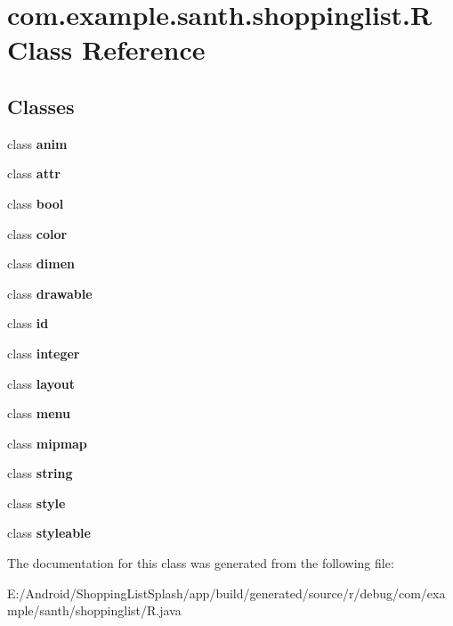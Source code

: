 \hypertarget{classcom_1_1example_1_1santh_1_1shoppinglist_1_1_r}{}\section{com.\+example.\+santh.\+shoppinglist.\+R Class Reference}
\label{classcom_1_1example_1_1santh_1_1shoppinglist_1_1_r}
\subsection*{Classes}
\begin{DoxyCompactItemize}
\item 
class {\bfseries anim}
\item 
class {\bfseries attr}
\item 
class {\bfseries bool}
\item 
class {\bfseries color}
\item 
class {\bfseries dimen}
\item 
class {\bfseries drawable}
\item 
class {\bfseries id}
\item 
class {\bfseries integer}
\item 
class {\bfseries layout}
\item 
class {\bfseries menu}
\item 
class {\bfseries mipmap}
\item 
class {\bfseries string}
\item 
class {\bfseries style}
\item 
class {\bfseries styleable}
\end{DoxyCompactItemize}


The documentation for this class was generated from the following file\+:\begin{DoxyCompactItemize}
\item 
E\+:/\+Android/\+Shopping\+List\+Splash/app/build/generated/source/r/debug/com/example/santh/shoppinglist/R.\+java\end{DoxyCompactItemize}
